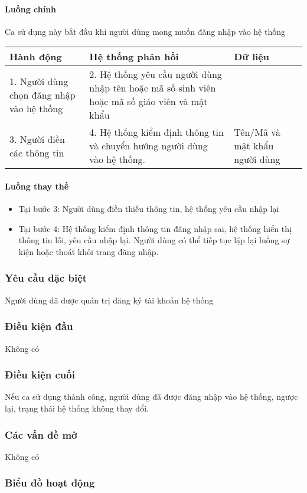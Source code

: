 \documentclass[./../main_file.tex]{subfiles}
\begin{document}
		\paragraph{Luồng chính}
		
		Ca sử dụng này bắt đầu khi người dùng mong muốn đăng nhập vào hệ thống
		\begin{table}[H]
			\begin{tabular}{|p{.33\textwidth}|p{}|p{}|}

				\hline
				\textbf{Hành động}                        & \textbf{Hệ thống phản hồi}                                                                    & \textbf{Dữ liệu}              
				\\ \hline
				1. Người dùng chọn đăng nhập vào hệ thống & 2. Hệ thống yêu cầu người dùng nhập tên hoặc mã số sinh viên hoặc mã số giáo viên và mật khẩu &                               
				\\ \hline
				3. Người điền các thông tin               & 4. Hệ thống kiểm định thông tin và chuyển hướng người dùng vào hệ thống.                      & Tên/Mã và mật khẩu người dùng 
				\\ \hline
				
			\end{tabular}
		\end{table}
		\paragraph{Luồng thay thế}
		\begin{itemize}
			\item Tại bước 3: Người dùng điền thiếu thông tin, hệ thống yêu cầu nhập lại
			\item Tại bước 4:  Hệ thống kiểm định thông tin đăng nhập sai, hệ thống hiển thị thông tin lỗi, yêu cầu nhập lại. Người dùng có thể tiếp tục lặp lại luồng sự kiện hoặc thoát khỏi trang đăng nhập.
			
		\end{itemize}
	\subsubsection{Yêu cầu đặc biệt}
	Người dùng đã được quản trị đăng ký tài khoản hệ thống
	
	\subsubsection{Điều kiện đầu}
	Không có
	
	\subsubsection{Điều kiện cuối}
	Nếu ca sử dụng thành công, người dùng đã được đăng nhập vào hệ thống, ngược lại, trạng thái hệ thống không thay đổi.
	\subsubsection{Các vấn đề mở}
	Không có
	
	\subsubsection{Biểu đồ hoạt động}

	
\end{document}
